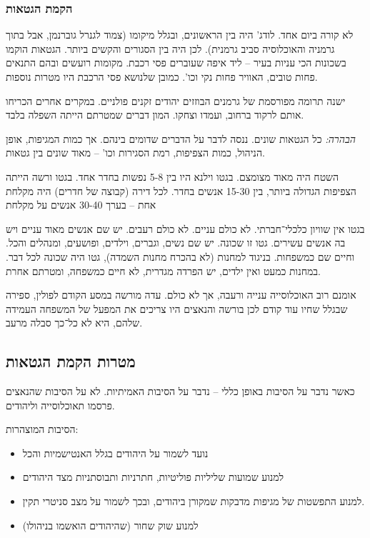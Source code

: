 \documentclass[]{article}
\begin{document}
    \subsubsection{הקמת הגטאות}
    לא קורה ביום אחד. לודג' היה בין הראשונים, ובגלל מיקומו (צמוד לגנרל גוברנמן, אבל בתוך גרמניה והאוכלוסיה סביב גרמנית). לכן היה בין הסגורים והקשים ביותר. הגטאות הוקמו בשכונות הכי עניות בעיר – ליד איפה שעוברים פסי רכבת. מקומות רועשים ובהם התנאים פחות טובים, האוויר פחות נקי וכו'. כמובן שלנושא פסי הרכבת היו מטרות נוספות. 
    
    ישנה תרומה מפורסמת של גרמנים הבוזזים יהודים זקנים פולניים. במקרים אחרים הכריחו אותם לרקוד ברחוב, ועמדו וצחקו. המון דברים שמטרתם הייתה השפלה בלבד. 
    
    \textit{הבהרה: }כל הגטאות שונים. ננסה לדבר על הדברים שדומים בינהם. אך כמות המגיפות, אופן הניהול, כמות הצפיפות, רמת הסגירות וכו' – מאוד שונים בין גטאות. 
    
    השטח היה מאוד מצומצם. בגטו וילנא היו בין 5-8 נפשות בחדר אחד. בגטו ורשה הייתה הצפיפות הגדולה ביותר, בין 15-30 אנשים בחדר. לכל דירה (קבוצה של חדרים) היה מקלחת אחת – בערך 30-40 אנשים על מקלחת
    
    בגטו אין שוויון כלכלי־חברתי. לא כולם עניים. לא כולם רעבים. יש שם אנשים מאוד עניים ויש בה אנשים עשירים. גטו זו שכונה. יש שם נשים, וגברים, וילדים, ופושעים, ומנהלים והכל. וחיים שם כמשפחות. בניגוד למחנות (לא בהכרח מחנות השמדה), גטו היה שכונה לכל דבר. במחנות כמעט ואין ילדים, יש הפרדה מגדרית, לא חיים כמשפחה, ומטרתם אחרת. 
    
    אומנם רוב האוכלוסייה ענייה ורעבה, אך לא כולם. עדה מורשה במסע הקודם לפולין, ספירה שבגלל שחיו עוד קודם לכן בורשה והנאצים היו צריכים את המפעל של המשפחה העמידה שלהם, היא לא כל־כך סבלה מרעב. 
    
    \subsection{מטרות הקמת הגטאות}
    כאשר נדבר על הסיבות באופן כללי – נדבר על הסיבות האמיתיות. לא על הסיבות שהנאצים פרסמו תאוכלוסייה וליהודים. 
    
    הסיבות המוצהרות: 
    \begin{itemize}
        \item נועד לשמור על היהודים בגלל האנטישמיות והכל
        \item למנוע שמועות שליליות פוליטיות, חתרניות ותבוסתניות מצד היהודים
        \item למנוע התפשטות של מגיפות מדבקות שמקורן ביהודים, ובכך לשמור על מצב סניטרי תקין. 
        \item למנוע שוק שחור (שהיהודים הואשמו בניהולו)
    \end{itemize}
    
\end{document}
